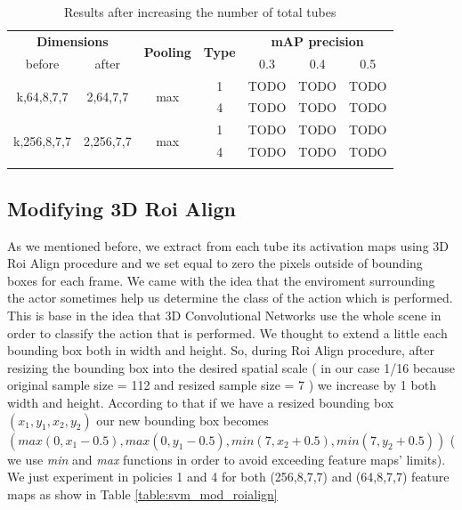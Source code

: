 \documentclass{report}
\begin{document}
\begin{center}
\begin{longtable}{||c | c| c| c||c c c||}

  \hline
 \multicolumn{2}{||c|}{\textbf{Dimensions}} & \multirow{2}{*}{\textbf{Pooling}} &\multirow{2}{*}{ \textbf{Type}} &\multicolumn{3}{|c||}{\textbf{mAP precision}}\\

  before & after & {} & {} & 0.3 &  0.4 & 0.5 \\
  \hline   \hline

  \multirow{2}{*}{k,64,8,7,7} & \multirow{2}{*}{2,64,7,7} & \multirow{2}{*}{max}  & 1 & TODO & TODO & TODO \\
  \cline{4-7}
  {} & {} & {} & 4 & TODO & TODO & TODO   \\
  \hline   
  \multirow{2}{*}{k,256,8,7,7} & \multirow{2}{*}{2,256,7,7} & \multirow{2}{*}{max}  & 1 & TODO & TODO & TODO \\
  \cline{4-7}
  {} & {} & {} & 4 & TODO & TODO & TODO   \\
  \hline   
  \caption{Results after increasing the number of total tubes }
  \label{table:svm_increased}

\end{longtable} 
\end{center}


\subsection{Modifying 3D Roi Align}
As we mentioned before, we extract from each tube its activation maps using 3D Roi Align procedure and we set equal to zero the pixels outside
of bounding boxes for each frame. We came with the idea that the enviroment surrounding the actor sometimes help us determine the class
of the action which is performed. This is base in the idea that 3D Convolutional Networks use the whole scene in order to classify the action
that is performed. We thought to extend a little each bounding box both in width and height. So, during Roi Align procedure, after resizing
the bounding box into the desired spatial scale  ( in our case 1/16 because original sample size = 112 and resized sample size = 7 )
we increase by 1 both width and height. According to that if we have a resized bounding box $( x_1,y_1,x_2,y_2) $ our new bounding box becomes
$ (max(0,x_1-0.5),max(0,y_1-0.5),min(7,x_2+0.5),min(7,y_2+0.5)) $ ( we use \textit{ min} and \textit{max} functions in order to avoid exceeding feature maps' limits).
We just experiment in policies 1 and 4 for both (256,8,7,7) and (64,8,7,7) feature maps as show in  Table \ref{table:svm_mod_roialign}
\end{document}
